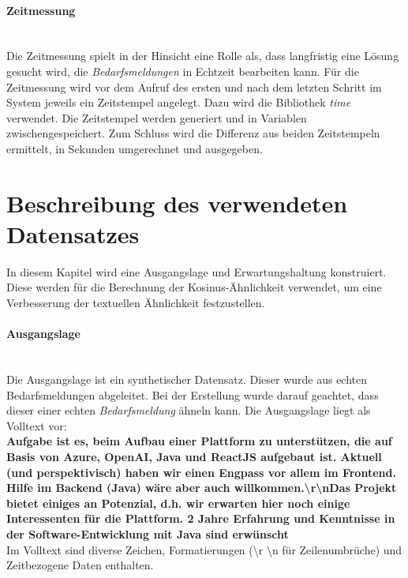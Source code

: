 \paragraph{Zeitmessung}\mbox{}\\
Die Zeitmessung spielt in der Hinsicht eine Rolle als, dass langfristig eine Lösung gesucht wird, die \emph{Bedarfsmeldungen} in Echtzeit bearbeiten kann. Für die Zeitmessung wird vor dem Aufruf des ersten und nach dem letzten Schritt im System jeweils ein Zeitstempel angelegt. Dazu wird die Bibliothek \emph{time} verwendet. Die Zeitstempel werden generiert und in Variablen zwischengespeichert. Zum Schluss wird die Differenz aus beiden Zeitstempeln ermittelt, in Sekunden umgerechnet und ausgegeben.\\
\section{Beschreibung des verwendeten Datensatzes}
In diesem Kapitel wird eine Ausgangslage und Erwartungshaltung konstruiert. Diese werden für die Berechnung der Kosinus-Ähnlichkeit verwendet, um eine Verbesserung der textuellen Ähnlichkeit festzustellen.
\paragraph{Ausgangslage}\mbox{}\\
Die Ausgangslage ist ein synthetischer Datensatz. Dieser wurde aus echten Bedarfsmeldungen abgeleitet. Bei der Erstellung wurde darauf geachtet, dass dieser einer echten \emph{Bedarfsmeldung} ähneln kann. Die Ausgangslage liegt als Volltext vor:\\

\textbf{Aufgabe ist es, beim Aufbau einer Plattform zu unterstützen, die auf Basis von Azure, OpenAI, Java und ReactJS aufgebaut ist. Aktuell (und perspektivisch) haben wir einen Engpass vor allem im Frontend. Hilfe im Backend (Java) wäre aber auch willkommen.\textbackslash r\textbackslash nDas Projekt bietet einiges an Potenzial, d.h. wir erwarten hier noch einige Interessenten für die Plattform. 2 Jahre Erfahrung und Kenntnisse in der Software-Entwicklung mit Java sind erwünscht}\\

Im Volltext sind diverse Zeichen, Formatierungen (\textbackslash r \textbackslash n für Zeilenumbrüche) und Zeitbezogene Daten enthalten.
